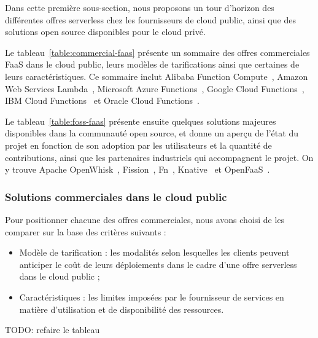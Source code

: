 Dans cette première sous-section, nous proposons un tour d'horizon des différentes offres serverless chez les fournisseurs de cloud public, ainsi que des solutions open source disponibles pour le cloud privé.

Le tableau~\ref{table:commercial-faas} présente un sommaire des offres commerciales FaaS dans le cloud public, leurs modèles de tarifications ainsi que certaines de leurs caractéristiques. Ce sommaire inclut Alibaba Function Compute~\cite{alibaba-function-compute}, Amazon Web Services Lambda~\cite{aws-lambda}, Microsoft Azure Functions~\cite{azure-functions}, Google Cloud Functions~\cite{google-cloud-functions}, IBM Cloud Functions~\cite{ibm-cloud-functions} et Oracle Cloud Functions~\cite{oracle-cloud-functions}.

Le tableau~\ref{table:foss-faas} présente ensuite quelques solutions majeures disponibles dans la communauté open source, et donne un aperçu de l'état du projet en fonction de son adoption par les utilisateurs et la quantité de contributions, ainsi que les partenaires industriels qui accompagnent le projet. On y trouve Apache OpenWhisk~\cite{openwhisk}, Fission~\cite{fission}, Fn~\cite{fn}, Knative~\cite{knative} et OpenFaaS~\cite{openfaas}.

\subsubsection{Solutions commerciales dans le cloud public}

Pour positionner chacune des offres commerciales, nous avons choisi de les comparer sur la base des critères suivants :

\begin{itemize}
    \item Modèle de tarification : les modalités selon lesquelles les clients peuvent anticiper le coût de leurs déploiements dans le cadre d'une offre serverless dans le cloud public ;
    \item Caractéristiques : les limites imposées par le fournisseur de services en matière d'utilisation et de disponibilité des ressources.
\end{itemize}

TODO: refaire le tableau

